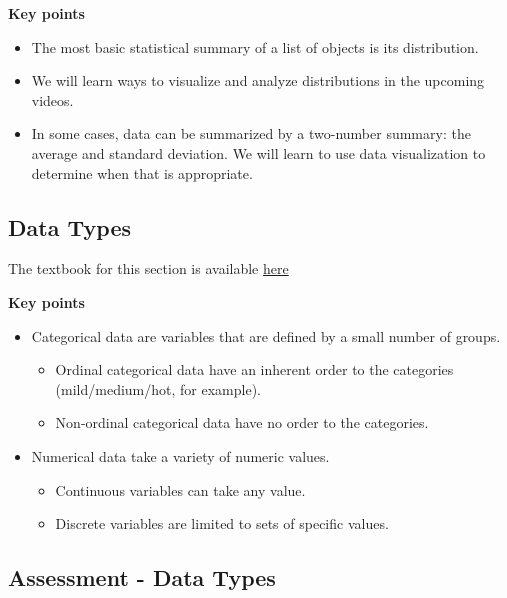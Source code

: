 \documentclass[
]{article}
\providecommand{\tightlist}{%
  \setlength{\itemsep}{0pt}\setlength{\parskip}{0pt}}
\begin{document}
\textbf{Key points}

\begin{itemize}
\tightlist
\item
  The most basic statistical summary of a list of objects is its
  distribution.
\item
  We will learn ways to visualize and analyze distributions in the
  upcoming videos.
\item
  In some cases, data can be summarized by a two-number summary: the
  average and standard deviation. We will learn to use data
  visualization to determine when that is appropriate.
\end{itemize}

\hypertarget{data-types}{%
\subsection{Data Types}\label{data-types}}

The textbook for this section is available
\href{https://rafalab.github.io/dsbook/distributions.html\#variable-types}{here}

\textbf{Key points}

\begin{itemize}
\tightlist
\item
  Categorical data are variables that are defined by a small number of
  groups.

  \begin{itemize}
  \tightlist
  \item
    Ordinal categorical data have an inherent order to the categories
    (mild/medium/hot, for example).
  \item
    Non-ordinal categorical data have no order to the categories.
  \end{itemize}
\item
  Numerical data take a variety of numeric values.

  \begin{itemize}
  \tightlist
  \item
    Continuous variables can take any value.
  \item
    Discrete variables are limited to sets of specific values.
  \end{itemize}
\end{itemize}

\hypertarget{assessment---data-types}{%
\subsection{Assessment - Data Types}\label{assessment---data-types}}
\end{document}
